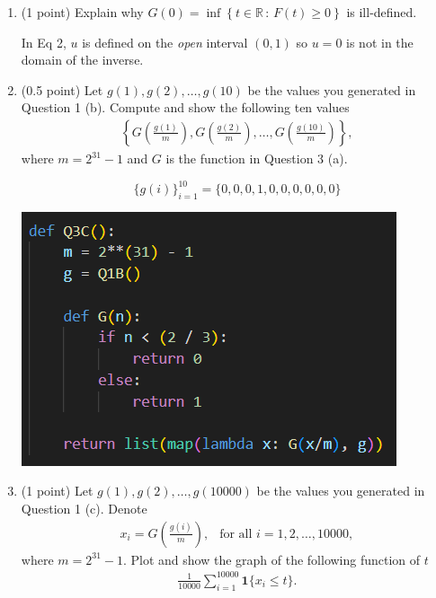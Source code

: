 \documentclass[11pt,letterpaper, leqno]{article}
\begin{document}
\begin{enumerate}
\begin{enumerate}
    \item (1 point) Explain why $G(0)=\inf\left\{ t\in\mathbb{R} \,:\, F(t)\ge 0
    \right\}$ is ill-defined.
    
    \color{blue}
        In Eq 2, $u$ is defined on the \emph{open} interval $(0, 1)$ so $u = 0$ is not in the domain of the inverse. 
    \color{black}

    \item (0.5 point) Let $g(1),g(2), \ldots, g(10)$ be the values you generated in Question 1 (b). Compute and show the following ten values
    \begin{align*}
        \left\{G\left(\frac{g(1)}{m}\right), G\left(\frac{g(2)}{m}\right), \ldots, G\left(\frac{g(10)}{m}\right)\right\},
    \end{align*}
    where $m=2^{31}-1$ and $G$ is the function in Question 3 (a).
    
    \color{blue}
        \[\{g(i)\}_{i=1}^{10} = \{0, 0, 0, 1, 0, 0, 0, 0, 0, 0\}\]
    \color{black}

    \begin{center}
        \includegraphics{Images/3C.png}
    \end{center}

    \item (1 point) Let $g(1),g(2), \ldots, g(10000)$ be the values you generated in Question 1 (c). Denote 
    \begin{align*}
        x_i=G\left(\frac{g(i)}{m}\right),\ \ \mbox{ for all }i=1,2,\ldots, 10000,
    \end{align*}
    where $m=2^{31}-1$. Plot and show the graph of the following function of $t$
    \begin{align*}
        \frac{1}{10000}\sum_{i=1}^{10000}\mathbf{1}\{x_i\le t\}.
    \end{align*}


\end{enumerate}
\end{enumerate}
\end{document}
